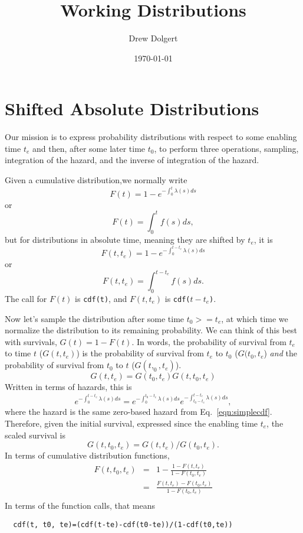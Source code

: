 \documentclass{article}
\title{Working Distributions}
\author{Drew Dolgert}
\date{\today}
\newcommand{\code}[1]{\texttt{#1}}
\begin{document}
\maketitle

\section{Shifted Absolute Distributions}
Our mission is to express probability distributions
with respect to some enabling time $t_e$ and then, after
some later time $t_0$, to perform three operations, sampling,
integration of the hazard, and the inverse of integration of
the hazard.

Given a cumulative distribution,we normally write
\begin{equation}
  F(t)=1-e^{-\int_{0}^t \lambda(s)ds}\label{eqn:simplecdf}
\end{equation}
or
\begin{equation}
  F(t)=\int_0^t f(s)ds,
\end{equation}
but for distributions in absolute time, meaning they are shifted
by $t_e$, it is
\begin{equation}
  F(t,t_e)=1-e^{-\int_{0}^{t-t_e} \lambda(s)ds}
\end{equation}
or
\begin{equation}
  F(t,t_e)=\int_{0}^{t-t_e} f(s)ds.
\end{equation}
The call for $F(t)$ is \code{cdf(t)}, and $F(t,t_e)$ is \code{cdf($t-t_e$)}.

Now let's sample the distribution after some time $t_0>=t_e$, at which time
we normalize the distribution to its remaining probability. We can
think of this best with survivals, $G(t)=1-F(t)$. In words, the probability of
survival from $t_e$ to time $t$ ($G(t,t_e)$) is the probability
of survival from $t_e$ to $t_0$ ($G(t_0,t_e$)
\emph{and} the probability of survival from $t_0$ to $t$ ($G(t,_0,t_e)$).
\begin{equation}
  G(t,t_e)=G(t_0,t_e)G(t,t_0,t_e)
\end{equation}
Written in terms of hazards, this is
\begin{equation}
  e^{-\int_{0}^{t-t_e} \lambda(s)ds}=e^{-\int_{0}^{t_0-t_e} \lambda(s)ds}
    e^{-\int_{t_0-t_e}^{t-t_e} \lambda(s)ds},
\end{equation}
where the hazard is the same zero-based hazard from Eq.~\ref{eqn:simplecdf}.
Therefore, given the initial survival, expressed since the enabling time $t_e$,
the scaled survival is
\begin{equation}
  G(t,t_0,t_e)=G(t,t_e)/G(t_0,t_e).
\end{equation}
In terms of cumulative distribution functions,
\begin{eqnarray}
  F(t,t_0,t_e)&=&1-\frac{1-F(t,t_e)}{1-F(t_0,t_e)} \\
          &=&\frac{F(t,t_e)-F(t_0,t_e)}{1-F(t_0,t_e)}\label{eqn:shiftcum} \\
\end{eqnarray}
In terms of the function calls, that means
\begin{lstlisting}
  cdf(t, t0, te)=(cdf(t-te)-cdf(t0-te))/(1-cdf(t0,te))
\end{lstlisting}
\end{document}
